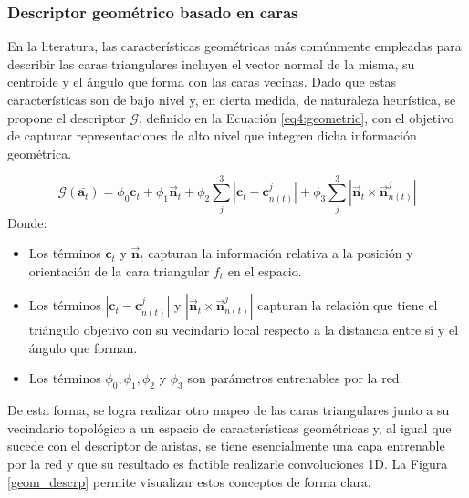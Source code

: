 \FloatBarrier

\subsubsection{Descriptor geométrico basado en caras}
En la literatura, las características geométricas más comúnmente empleadas para describir las caras triangulares incluyen el vector normal de la misma, su centroide y el ángulo que forma con las caras vecinas. Dado que estas características son de bajo nivel y, en cierta medida, de naturaleza heurística, se propone el descriptor $\mathcal{G}$, definido en la Ecuación \ref{eq4:geometric}, con el objetivo de capturar representaciones de alto nivel que integren dicha información geométrica.

\begin{equation}
\label{eq4:geometric}
    \mathcal{G}(\bar{\textbf{a}_{t}}) = \phi_{0} \textbf{c}_{t} + \phi_{1} \overrightarrow{\textbf{n}}_{t} + \phi_{2} \sum_{j}^{3} | \textbf{c}_{t} - \textbf{c}_{n(t)}^{j} | + \phi_{3} \sum_{j}^{3} | \overrightarrow{\textbf{n}}_{t} \times \overrightarrow{\textbf{n}}_{n(t)}^j |
\end{equation}
Donde:
\begin{itemize}
    \item Los términos $\textbf{c}_{t}$ y $\overrightarrow{\textbf{n}}_{t}$ capturan la información relativa a la posición y orientación de la cara triangular $f_t$ en el espacio.
    \item Los términos $| \textbf{c}_{t} - \textbf{c}_{n(t)}^{j} |$ y $| \overrightarrow{\textbf{n}}_{t} \times \overrightarrow{\textbf{n}}_{n(t)}^j |$ capturan la relación que tiene el triángulo objetivo con su vecindario local respecto a la distancia entre sí y el ángulo que forman.
    \item Los términos $\phi_{0}, \phi_{1}, \phi_{2} $ y $\phi_{3}$ son parámetros entrenables por la red.
\end{itemize}

De esta forma, se logra realizar otro mapeo de las caras triangulares junto a su vecindario topológico a un espacio de características geométricas y, al igual que sucede con el descriptor de aristas, se tiene esencialmente una capa entrenable por la red y que su resultado es factible realizarle convoluciones 1D. La Figura \ref{geom_descrp} permite visualizar estos conceptos de forma clara.

